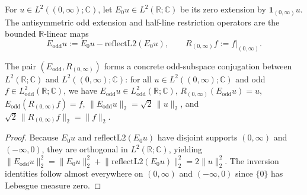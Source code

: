 \begin{definition}\label{def:concrete_odd_ext_rest}
\leanok
For $u \in L^2((0, \infty); \mathbb{C})$, let $E_0 u \in L^2(\mathbb{R}; \mathbb{C})$ be its zero extension by $\mathbf{1}_{(0, \infty)} u$. The antisymmetric odd extension and half-line restriction operators are the bounded $\mathbb{R}$-linear maps
\[
  E_{\mathrm{odd}} u := E_0 u - \mathrm{reflectL2}(E_0 u), \qquad R_{(0, \infty)} f := f|_{(0, \infty)}.
\]
\end{definition}

\begin{theorem}\label{thm:concrete_half_line_odd_conjugation}
\leanok
The pair $(E_{\mathrm{odd}}, R_{(0, \infty)})$ forms a concrete odd-subspace conjugation between $L^2(\mathbb{R}; \mathbb{C})$ and $L^2((0, \infty); \mathbb{C})$: for all $u \in L^2((0, \infty); \mathbb{C})$ and odd $f \in L^2_{\mathrm{odd}}(\mathbb{R}; \mathbb{C})$, we have $E_{\mathrm{odd}} u \in L^2_{\mathrm{odd}}(\mathbb{R}; \mathbb{C})$, $R_{(0, \infty)}(E_{\mathrm{odd}} u) = u$, $E_{\mathrm{odd}}(R_{(0, \infty)} f) = f$, $\lVert E_{\mathrm{odd}} u \rVert_2 = \sqrt{2}\,\lVert u \rVert_2$, and $\sqrt{2}\,\lVert R_{(0, \infty)} f \rVert_2 = \lVert f \rVert_2$.
\end{theorem}

\begin{proof}
\leanok
Because $E_0 u$ and $\mathrm{reflectL2}(E_0 u)$ have disjoint supports $(0, \infty)$ and $(-\infty, 0)$, they are orthogonal in $L^2(\mathbb{R}; \mathbb{C})$, yielding $\lVert E_{\mathrm{odd}} u \rVert_2^2 = \lVert E_0 u \rVert_2^2 + \lVert \mathrm{reflectL2}(E_0 u) \rVert_2^2 = 2 \lVert u \rVert_2^2$. The inversion identities follow almost everywhere on $(0, \infty)$ and $(-\infty, 0)$ since $\{0\}$ has Lebesgue measure zero.
\end{proof}


